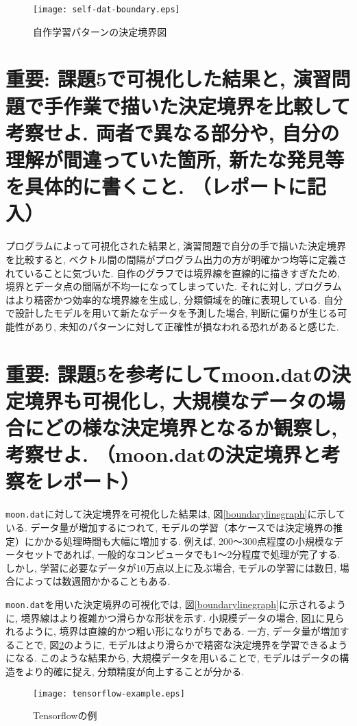 \documentclass[a4j, 10pt]{jarticle}
\begin{document}
\begin{figure}[H]
  \centering
  \texttt{[image: self-dat-boundary.eps]}
  \caption{自作学習パターンの決定境界図}\label{self-data-boundary}
\end{figure}
\section{重要: 課題5で可視化した結果と, 演習問題で手作業で描いた決定境界を比較して考察せよ. 両者で異なる部分や, 自分の理解が間違っていた箇所, 新たな発見等を具体的に書くこと. （レポートに記入）}

プログラムによって可視化された結果と, 演習問題で自分の手で描いた決定境界を比較すると, ベクトル間の間隔がプログラム出力の方が明確かつ均等に定義されていることに気づいた. 自作のグラフでは境界線を直線的に描きすぎたため, 境界とデータ点の間隔が不均一になってしまっていた. それに対し, プログラムはより精密かつ効率的な境界線を生成し, 分類領域を的確に表現している. 自分で設計したモデルを用いて新たなデータを予測した場合, 判断に偏りが生じる可能性があり, 未知のパターンに対して正確性が損なわれる恐れがあると感じた. 

\section{重要: 課題5を参考にしてmoon.datの決定境界も可視化し, 大規模なデータの場合にどの様な決定境界となるか観察し, 考察せよ. （moon.datの決定境界と考察をレポート）}

\texttt{moon.dat}に対して決定境界を可視化した結果は, 図\ref{boundarylinegraph}に示している. データ量が増加するにつれて, モデルの学習（本ケースでは決定境界の推定）にかかる処理時間も大幅に増加する. 例えば, 200〜300点程度の小規模なデータセットであれば, 一般的なコンピュータでも1〜2分程度で処理が完了する. しかし, 学習に必要なデータが10万点以上に及ぶ場合, モデルの学習には数日, 場合によっては数週間かかることもある. 

\texttt{moon.dat}を用いた決定境界の可視化では, 図\ref{boundarylinegraph}に示されるように, 境界線はより複雑かつ滑らかな形状を示す. 小規模データの場合, 図\ref{self-data-boundary}に見られるように, 境界は直線的かつ粗い形になりがちである. 一方, データ量が増加することで, 図\ref{tensorflow-example}のように, モデルはより滑らかで精密な決定境界を学習できるようになる. このような結果から, 大規模データを用いることで, モデルはデータの構造をより的確に捉え, 分類精度が向上することが分かる. 

\begin{figure}[H]
  \centering
  \texttt{[image: tensorflow-example.eps]}
  \caption{Tensorflowの例}\label{tensorflow-example}
\end{figure}
\end{document}

